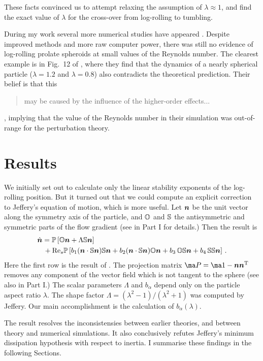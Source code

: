 \documentclass[thesis.tex]{subfiles}
\begin{document}
These facts convinced us to attempt relaxing the assumption of $\lambda\approx1$, and find the exact value of $\lambda$ for the cross-over from log-rolling to tumbling.

During my work several more numerical studies have appeared \cite{rosen2014,mao2014,rosen2015a,rosen2015b}. Despite improved methods and more raw computer power, there was still no evidence of log-rolling prolate spheroids at small values of the Reynolds number. The clearest example is in Fig.~12 of \citet{mao2014}, where they find that the dynamics of a nearly spherical particle ($\lambda=1.2$ and $\lambda=0.8$) also contradicts the theoretical prediction. Their belief is that this \blockquote{may be caused by the influence
of the higher-order effects...}, implying that the value of the Reynolds number in their simulation was out-of-range for the perturbation theory.

\section{Results}

We initially set out to calculate only the linear stability exponents of the log-rolling position. But it turned out that we could compute an explicit correction to Jeffery's equation of motion, which is more useful. Let $\mbox{\boldmath$n$}$ be the unit vector along the symmetry axis of the particle, and $\mathbb{O}$ and $\mathbb{S}$ the antisymmetric and symmetric parts of the flow gradient (see  in Part I for details.) Then the result is
\begin{align}
\eqnlab{ndoteffective}
  \dot {\ve n} &=  
\ma P\left[\ma O \ve n + \Lambda\ma S\ve n\right]\\
&\,+\Reys\ma P\left[b_1 (\ve n \cdot \ma S \ve n)\ma S \ve n
+ b_2 (\ve n \cdot \ma S \ve n)\ma O \ve n 
+b_3\,  \ma O \ma S \ve n 
+ b_4\,  \ma S \ma S \ve n\right]\,. \nn
\end{align}
Here the first row is the result of \citet{jeffery1922}. The projection matrix $\ma P=\ma 1 - \ve n \ve n\transpose$ removes any component of the vector field which is not tangent to the sphere (see also  in Part I.) The scalar parameters $\Lambda$ and $b_\alpha$ depend only on the particle aspect ratio $\lambda$. The shape factor $\Lambda=(\lambda^2-1)/(\lambda^2+1)$ was computed by Jeffery. Our main accomplishment is the calculation of $b_\alpha(\lambda)$.

The result  resolves the inconsistensies between earlier theories, and between theory and numerical simulations. It also conclusively refutes Jeffery's minimum dissipation hypothesis with respect to inertia. I summarise these findings in the following Sections.
\end{document}
